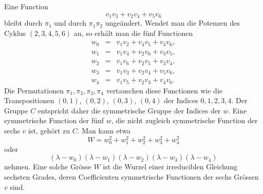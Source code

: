 \documentclass[11pt]{article}
\begin{document}
Eine Function
\[
  v_1v_3+v_2v_4+v_5v_6
\]
bleibt durch $\pi_1$ und durch $\pi_1\pi_2$ ungeändert. Wendet man die Potenzen des Cyklus $(2,3,4,5,6)$ an, so erhält man die fünf Functionen
\[
\begin{array}{rcl}
 w_0&=&v_1v_2+v_4v_5+v_3v_6,\\
 w_1&=&v_1v_4+v_2v_6+v_3v_5,\\
 w_2&=&v_1v_6+v_2v_5+v_3v_4,\\
 w_3&=&v_1v_3+v_2v_4+v_5v_6,\\
 w_4&=&v_1v_5+v_2v_3+v_4v_6.
\end{array}                                                       \tag{2}
\]
Die Permutationen $\pi_1,
\pi_2,
\pi_3,
\pi_4$ vertauschen diese Functionen wie die Transpositionen $(0,1)$, $(0,2)$, $(0,3)$, $(0,4)$ der Indices $0,1,2,3,4$. Der Gruppe $C$ entspricht daher die symmetrische Gruppe der Indices der $w$. Eine symmetrische Function der fünf $w$, die nicht zugleich symmetrische Function der sechs $v$ ist, gehört zu $C$. Man kann etwa
\[
  W=w_0^2+w_1^2+w_2^2+w_3^2+w_4^2
\]
oder
\[
  (\lambda-w_0)(\lambda-w_1)(\lambda-w_2)(\lambda-w_3)(\lambda-w_4)
\]
nehmen. Eine solche Grösse $W$ ist die Wurzel einer irreduciblen Gleichung sechsten Grades, deren Coefficienten symmetrische Functionen der sechs Grössen $v$ sind.
\end{document}

